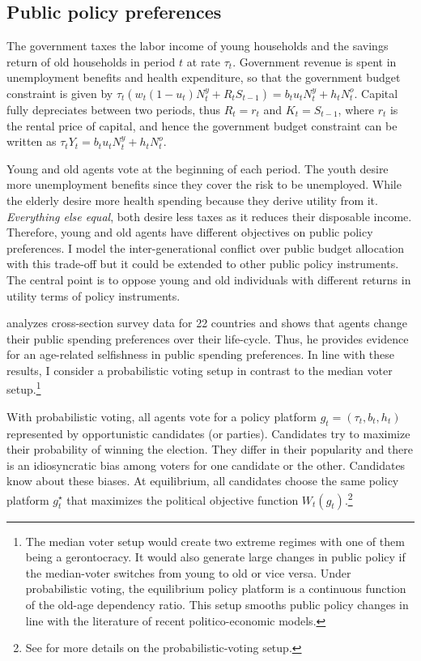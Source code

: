 \subsection{Public policy preferences}\label{subsec:public_policy_preferences}

The government taxes the labor income of young households and the savings return of old households in period $t$ at rate $\tau_t$. Government revenue is spent in unemployment benefits and health expenditure, so that the government budget constraint is given by $\tau_t\left( w_t(1-u_t)N^y_t + R_t S_{t-1} \right) = b_t u_t N^y_t + h_t N^o_t$. Capital fully depreciates between two periods, thus  $R_t = r_t$ and $K_t = S_{t-1}$, where $r_t$ is the rental price of capital, and hence the government budget constraint can be written as $\tau_t Y_t = b_t u_t N^y_t + h_t N^o_t$.

Young and old agents vote at the beginning of each period. The youth desire more unemployment benefits since they cover the risk to be unemployed. While the elderly desire more health spending because they derive utility from it. \textit{Everything else equal}, both desire less taxes as it reduces their disposable income. Therefore, young and old agents have different objectives on public policy preferences. I model the inter-generational conflict over public budget allocation with this trade-off but it could be extended to other public policy instruments. The central point is to oppose young and old individuals with different returns in utility terms of policy instruments.

\cite{Sorensen2013} analyzes cross-section survey data for 22 countries and shows that agents change their public spending preferences over their life-cycle. Thus, he provides evidence for an age-related selfishness in public spending preferences. In line with these results, I consider a probabilistic voting setup in contrast to the median voter setup.\footnote{The median voter setup would create two extreme regimes with one of them being a gerontocracy. It would also generate large changes in public policy if the median-voter switches from young to old or vice versa. Under probabilistic voting, the equilibrium policy platform is a continuous function of the old-age dependency ratio. This setup smooths public policy changes in line with the literature of recent politico-economic models.}

With probabilistic voting, all agents vote for a policy platform $g_t = (\tau_t, b_t, h_t)$ represented by opportunistic candidates (or parties). Candidates try to maximize their probability of winning the election. They differ in their popularity and there is an idiosyncratic bias among voters for one candidate or the other. Candidates know about these biases. At equilibrium, all candidates choose the same policy platform $g_t^\star$ that maximizes the political objective function $W_t(g_t)$.\footnote{See \cite{Lindbeck1987} for more details on the probabilistic-voting setup.}

